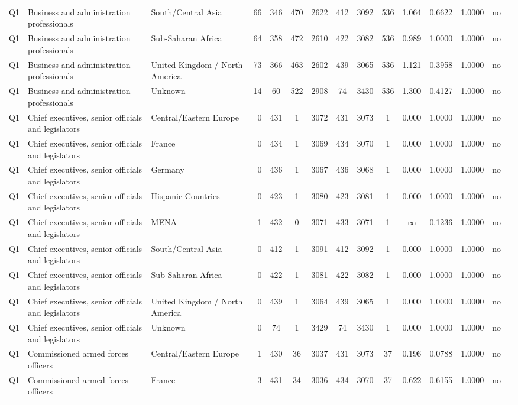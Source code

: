 \begin{longtable}{lllrcccccccccll}
Q1 & Business and administration professionals & South/Central Asia & 66 & 346 & 470 & 2622 & 412 & 3092 & 536 & 1.064 & 0.6622 & 1.0000 & no \\
Q1 & Business and administration professionals & Sub-Saharan Africa & 64 & 358 & 472 & 2610 & 422 & 3082 & 536 & 0.989 & 1.0000 & 1.0000 & no \\
Q1 & Business and administration professionals & United Kingdom / North America & 73 & 366 & 463 & 2602 & 439 & 3065 & 536 & 1.121 & 0.3958 & 1.0000 & no \\
Q1 & Business and administration professionals & Unknown & 14 & 60 & 522 & 2908 & 74 & 3430 & 536 & 1.300 & 0.4127 & 1.0000 & no \\
Q1 & Chief executives, senior officials and legislators & Central/Eastern Europe & 0 & 431 & 1 & 3072 & 431 & 3073 & 1 & 0.000 & 1.0000 & 1.0000 & no \\
Q1 & Chief executives, senior officials and legislators & France & 0 & 434 & 1 & 3069 & 434 & 3070 & 1 & 0.000 & 1.0000 & 1.0000 & no \\
Q1 & Chief executives, senior officials and legislators & Germany & 0 & 436 & 1 & 3067 & 436 & 3068 & 1 & 0.000 & 1.0000 & 1.0000 & no \\
Q1 & Chief executives, senior officials and legislators & Hispanic Countries & 0 & 423 & 1 & 3080 & 423 & 3081 & 1 & 0.000 & 1.0000 & 1.0000 & no \\
Q1 & Chief executives, senior officials and legislators & MENA & 1 & 432 & 0 & 3071 & 433 & 3071 & 1 & $\infty$ & 0.1236 & 1.0000 & no \\
Q1 & Chief executives, senior officials and legislators & South/Central Asia & 0 & 412 & 1 & 3091 & 412 & 3092 & 1 & 0.000 & 1.0000 & 1.0000 & no \\
Q1 & Chief executives, senior officials and legislators & Sub-Saharan Africa & 0 & 422 & 1 & 3081 & 422 & 3082 & 1 & 0.000 & 1.0000 & 1.0000 & no \\
Q1 & Chief executives, senior officials and legislators & United Kingdom / North America & 0 & 439 & 1 & 3064 & 439 & 3065 & 1 & 0.000 & 1.0000 & 1.0000 & no \\
Q1 & Chief executives, senior officials and legislators & Unknown & 0 & 74 & 1 & 3429 & 74 & 3430 & 1 & 0.000 & 1.0000 & 1.0000 & no \\
Q1 & Commissioned armed forces officers & Central/Eastern Europe & 1 & 430 & 36 & 3037 & 431 & 3073 & 37 & 0.196 & 0.0788 & 1.0000 & no \\
Q1 & Commissioned armed forces officers & France & 3 & 431 & 34 & 3036 & 434 & 3070 & 37 & 0.622 & 0.6155 & 1.0000 & no \\

\end{longtable}
